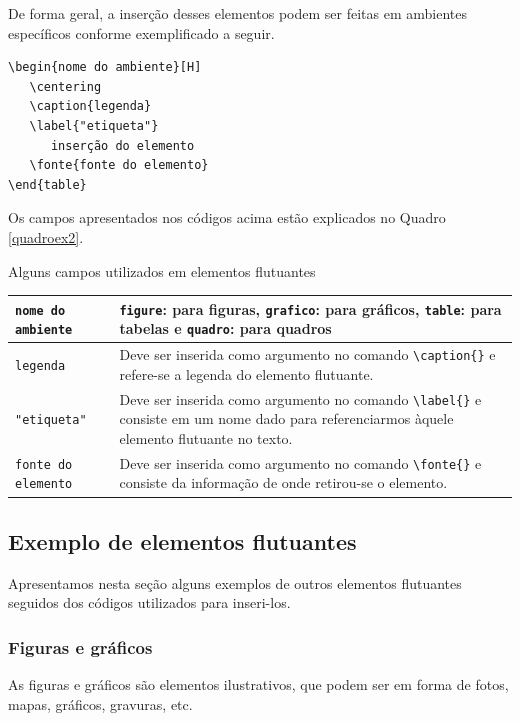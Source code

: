 De forma geral, a inserção desses elementos podem ser feitas em ambientes específicos conforme exemplificado a seguir.


\begin{verbatim}
\begin{nome do ambiente}[H]
   \centering
   \caption{legenda}
   \label{"etiqueta"}
      inserção do elemento 
   \fonte{fonte do elemento}
\end{table}
\end{verbatim}
Os campos apresentados nos códigos acima estão explicados no Quadro \ref{quadroex2}.

\begin{quadro}[H]
	\centering
	\caption{Alguns campos utilizados em elementos flutuantes}
	\label{quadroex2}
	\begin{tabular}{|m{4cm}|m{8cm}|}
		\hline
	\verb|nome do ambiente| & \verb|figure|: para figuras, \verb|grafico|: para gráficos, \verb|table|: para tabelas e \verb|quadro|: para quadros\\ \hline
	\verb|legenda| & Deve ser inserida como argumento no comando \verb|\caption{}| e refere-se a legenda do elemento flutuante.\\ \hline
	\verb|"etiqueta"| & Deve ser inserida como argumento no comando \verb|\label{}| e consiste em um nome dado para referenciarmos àquele elemento flutuante no texto.\\ \hline
	\verb|fonte do elemento| & Deve ser inserida como argumento no comando \verb|\fonte{}| e consiste da informação de onde retirou-se o elemento.\\ \hline
	\end{tabular}
\end{quadro}

\subsection{Exemplo de elementos flutuantes}

Apresentamos nesta seção alguns exemplos de outros elementos flutuantes seguidos dos códigos utilizados para inseri-los.

\subsubsection{Figuras e gráficos}

As figuras e gráficos são elementos ilustrativos, que podem ser em forma de fotos, mapas, gráficos, gravuras, etc.

